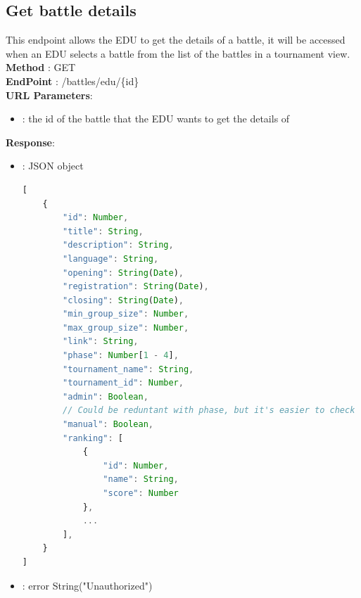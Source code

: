 \subsection*{Get battle details}
This endpoint allows the EDU to get the details of a battle, it will be accessed when an EDU selects a battle from the list of the battles in a tournament view.\\
\textbf{Method} : GET \\
\textbf{EndPoint} : /battles/edu/\{id\}\\
\textbf{URL Parameters}:
\begin{itemize}
    \item {}: the id of the battle that the EDU wants to get the details of
\end{itemize}
\textbf{Response}:
\begin{itemize}
    \item {} : JSON object
          \begin{lstlisting}[language=JavaScript, label={lst:jscode}, basicstyle=\ttfamily]
[
    {
        "id": Number,
        "title": String,
        "description": String,
        "language": String,
        "opening": String(Date),
        "registration": String(Date),
        "closing": String(Date),
        "min_group_size": Number,
        "max_group_size": Number,
        "link": String,
        "phase": Number[1 - 4],
        "tournament_name": String,
        "tournament_id": Number,
        "admin": Boolean,
        // Could be reduntant with phase, but it's easier to check
        "manual": Boolean,
        "ranking": [
            {
                "id": Number,
                "name": String,
                "score": Number
            },
            ...
        ],
    }
]
            \end{lstlisting}
    \item {} : error String("Unauthorized")
\end{itemize}

